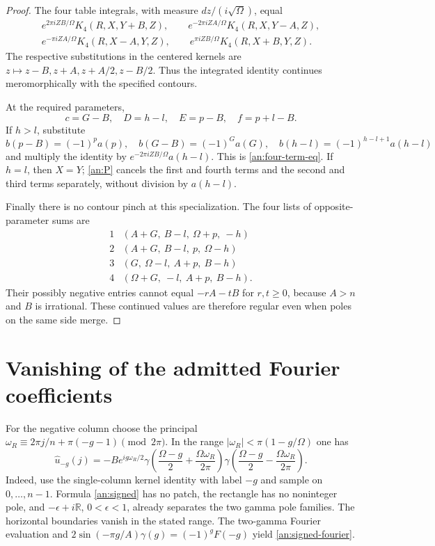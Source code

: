 \documentclass[11pt]{article}
\numberwithin{equation}{section}
\theoremstyle{definition}
\theoremstyle{remark}
\begin{document}
\begin{proof}
The four table integrals, with measure $dz/(i\sqrt\Omega)$, equal
\begin{gather*}
 e^{2\pi iZB/\Omega}K_4(R,X,Y+B,Z),\qquad
 e^{-2\pi iZA/\Omega}K_4(R,X,Y-A,Z),\\
 e^{-\pi iZA/\Omega}K_4(R,X-A,Y,Z),\qquad
 e^{\pi iZB/\Omega}K_4(R,X+B,Y,Z).
\end{gather*}
The respective substitutions in the centered kernels are
$z\mapsto z-B,z+A,z+A/2,z-B/2$.  Thus the integrated identity
continues meromorphically with the specified contours.

At the required parameters,
\[
 c=G-B,\quad D=h-l,\quad E=p-B,\quad f=p+l-B.
\]
If $h>l$, substitute
\[
 b(p-B)=(-1)^pa(p),\quad b(G-B)=(-1)^Ga(G),\quad
 b(h-l)=(-1)^{h-l+1}a(h-l)
\]
and multiply the identity by $e^{-2\pi iZB/\Omega}a(h-l)$.
This is \eqref{an:four-term-eq}.  If $h=l$, then $X=Y$;
\eqref{an:P} cancels the first and fourth terms and the second
and third terms separately, without division by $a(h-l)$.

Finally there is no contour pinch at this specialization.  The four
lists of opposite-parameter sums are
\[
\begin{array}{c|c}
 1&(A+G,\ B-l,\ \Omega+p,\ -h)\\
 2&(A+G,\ B-l,\ p,\ \Omega-h)\\
 3&(G,\ \Omega-l,\ A+p,\ B-h)\\
 4&(\Omega+G,\ -l,\ A+p,\ B-h).
\end{array}
\]
Their possibly negative entries cannot equal $-rA-tB$ for
$r,t\ge0$, because $A>n$ and $B$ is irrational.  These continued
values are therefore regular even when poles on the same side merge.
\end{proof}

\section{Vanishing of the admitted Fourier coefficients}
\label{an:vanishing-section}

For the negative column choose the principal
$\omega_R\equiv2\pi j/n+\pi(-g-1)\pmod{2\pi}$.
In the range $|\omega_R|<\pi(1-g/\Omega)$ one has
\begin{equation}
 \widehat u_{-g}(j)=-B e^{ig\omega_R/2}
  \gamma\left(\frac{\Omega-g}{2}+\frac{\Omega\omega_R}{2\pi}\right)
  \gamma\left(\frac{\Omega-g}{2}-\frac{\Omega\omega_R}{2\pi}\right).
 \label{an:signed-fourier}
\end{equation}
Indeed, use the single-column kernel identity with label $-g$ and
sample on $0,\ldots,n-1$.  Formula \eqref{an:signed} has no patch,
the rectangle has no noninteger pole, and
$-\epsilon+i\mathbb R$, $0<\epsilon<1$, already separates the
two gamma pole families.  The horizontal boundaries vanish in the
stated range.  The two-gamma Fourier evaluation and
$2\sin(-\pi g/A)\gamma(g)=(-1)^gF(-g)$ yield
\eqref{an:signed-fourier}.
\end{document}
